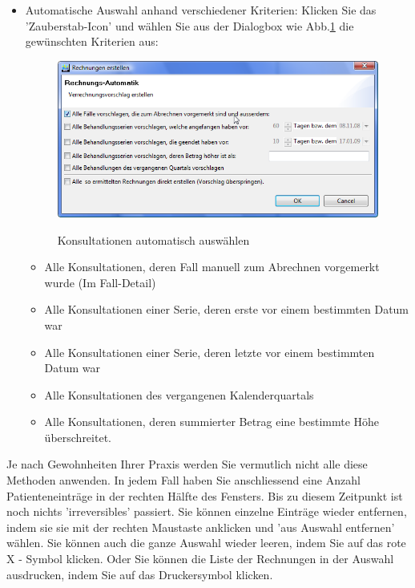 \documentclass[a4paper]{scrartcl}
\begin{document}
\begin{itemize}
\item Automatische Auswahl anhand verschiedener Kriterien: Klicken Sie das 'Zauberstab-Icon' und wählen Sie aus der Dialogbox wie Abb.\ref{fig:abr9} die gewünschten Kriterien aus:
\begin{figure}
  \includegraphics[width=1.0\textwidth]{abr9}\\
  \caption{Konsultationen automatisch auswählen}\label{fig:abr9}
\end{figure}
\begin{itemize}
    \item Alle Konsultationen, deren Fall manuell zum Abrechnen vorgemerkt wurde (Im Fall-Detail)
    \item Alle Konsultationen einer Serie, deren erste vor einem bestimmten Datum war
    \item Alle Konsultationen einer Serie, deren letzte vor einem bestimmten Datum war
    \item Alle Konsultationen des vergangenen Kalenderquartals
    \item Alle Konsultationen, deren summierter Betrag eine bestimmte Höhe überschreitet.
    \end{itemize}
\end{itemize}

Je nach Gewohnheiten Ihrer Praxis werden Sie vermutlich nicht alle diese Methoden anwenden. In jedem Fall haben Sie anschliessend eine Anzahl Patienteneinträge in der rechten Hälfte des Fensters. Bis zu diesem Zeitpunkt ist noch nichts 'irreversibles' passiert. Sie können einzelne Einträge wieder entfernen, indem sie sie mit der rechten Maustaste anklicken und 'aus Auswahl entfernen' wählen. Sie können auch die ganze Auswahl wieder leeren, indem Sie auf das rote X - Symbol klicken. Oder Sie können die Liste der Rechnungen in der Auswahl ausdrucken, indem Sie auf das Druckersymbol klicken.
\end{document}

